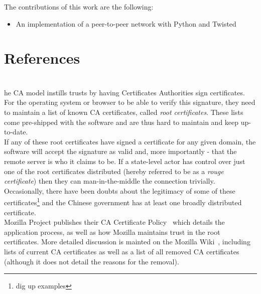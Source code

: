 \documentclass[a4paper]{article}           %
\newcommand{\tmpsection}[1]{}
\let\tmpsection=\section
\renewcommand{\section}[2]{

    \ifthenelse{
      \equal{#2}{*} %
    }
    {
      \tmpsection{References}
      \tmpsection{\sc{#2} }
    }
    {\tmpsection{\sc{#1} } }
      

}
\begin{document}
The contributions of this work are the following:

\begin{itemize}

  \item An implementation of a peer-to-peer network with Python and Twisted

\end{itemize}

\section{Vendor-shipped CA certificates}

The CA model instills trusts by having Certificates Authorities sign
certificates. For the operating system or browser to be able to verify
this signature, they need to maintain a list of known CA certificates,
called \textit{root certificates}.  These lists come pre-shipped with
the software and are thus hard to maintain and keep up-to-date. \\

If any of these root certificates have signed a certificate for any
given domain, the software will accept the signature as valid and,
more importantly - that the remote server is who it claims to be. If a
state-level actor has control over just one of the root certificates
distributed (hereby referred to be as a \textit{rouge certificate})
then they can man-in-the-middle the connection
trivially. Occasionally, there have been doubts about the legitimacy
of some of these certificates\footnote{dig up examples} and the
Chinese government has at least one broadly distributed
certificate. \\

Mozilla Project publishes their CA Certificate
Policy~\cite{mozillacapolicy} which details the application process,
as well as how Mozilla maintains trust in the root certificates. More
detailed discussion is mainted on the Mozilla
Wiki~\cite{mozillacawiki}, including lists of current CA certificates
as well as a list of all removed CA certificates (although it does not
detail the reasons for the removal).\\

\end{document}
